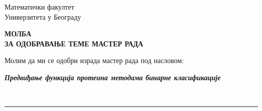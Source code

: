 \documentclass[a4paper]{article}
\begin{document}
\thispagestyle{empty}

\begin{flushleft}
Математички факултет\\
Универзитета у Београду
\end{flushleft}

\bigskip

\begin{center}
\textbf{МОЛБА\\
ЗА ОДОБРАВАЊЕ ТЕМЕ МАСТЕР РАДА
}\end{center}

\bigskip

\begin{flushleft}
Молим да ми се одобри израда мастер рада под насловом:
\end{flushleft}

\begin{minipage}{16.5cm}
\textbf{\textit{Предвиђање функција протеина методама бинарне класификације}}
\end{minipage}\\
\rule[4mm]{17.5cm}{.05mm}
\end{document}
